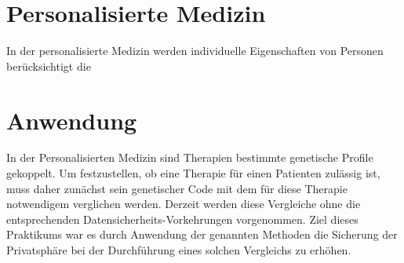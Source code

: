 \section{Personalisierte Medizin}
In der personalisierte Medizin werden individuelle Eigenschaften von Personen berücksichtigt die  

\section{Anwendung}
In der Personalisierten Medizin sind  Therapien bestimmte genetische Profile  gekoppelt.
Um festzustellen, ob eine Therapie für einen Patienten zulässig ist, muss daher zunächst sein genetischer Code mit dem für diese Therapie notwendigem verglichen werden.
Derzeit werden diese Vergleiche ohne die entsprechenden Datensicherheits-Vorkehrungen vorgenommen.
Ziel dieses Praktikums war es durch Anwendung der genannten Methoden die Sicherung der Privatsphäre bei der Durchführung eines solchen Vergleichs zu erhöhen.


